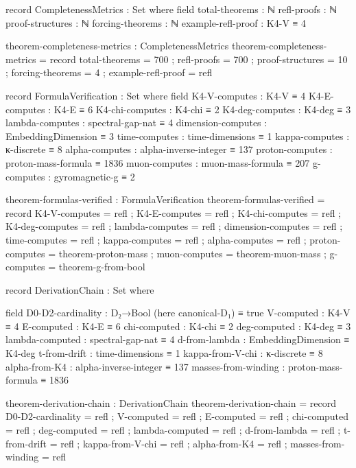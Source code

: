 \documentclass[11pt,a4paper]{book}
\begin{document}
\begin{code}
record CompletenessMetrics : Set where
  field
    total-theorems      : ℕ
    refl-proofs         : ℕ
    proof-structures    : ℕ
    forcing-theorems    : ℕ
    example-refl-proof   : K4-V ≡ 4

\end{code}

\begin{code}
theorem-completeness-metrics : CompletenessMetrics
theorem-completeness-metrics = record
  { total-theorems = 700
  ; refl-proofs = 700
  ; proof-structures = 10
  ; forcing-theorems = 4
  ; example-refl-proof = refl
  }

record FormulaVerification : Set where
  field
    K4-V-computes        : K4-V ≡ 4
    K4-E-computes        : K4-E ≡ 6
    K4-chi-computes      : K4-chi ≡ 2
    K4-deg-computes      : K4-deg ≡ 3
    lambda-computes      : spectral-gap-nat ≡ 4
    dimension-computes   : EmbeddingDimension ≡ 3
    time-computes        : time-dimensions ≡ 1
    kappa-computes       : κ-discrete ≡ 8
    alpha-computes       : alpha-inverse-integer ≡ 137
    proton-computes      : proton-mass-formula ≡ 1836
    muon-computes        : muon-mass-formula ≡ 207
    g-computes           : gyromagnetic-g ≡ 2

theorem-formulas-verified : FormulaVerification
theorem-formulas-verified = record
  { K4-V-computes = refl
  ; K4-E-computes = refl
  ; K4-chi-computes = refl
  ; K4-deg-computes = refl
  ; lambda-computes = refl
  ; dimension-computes = refl
  ; time-computes = refl
  ; kappa-computes = refl
  ; alpha-computes = refl
  ; proton-computes = theorem-proton-mass
  ; muon-computes = theorem-muon-mass
  ; g-computes = theorem-g-from-bool
  }
\end{code}

\begin{code}
record DerivationChain : Set where

  field
    D0-D2-cardinality    : D₂→Bool (here canonical-D₁) ≡ true
    V-computed           : K4-V ≡ 4
    E-computed           : K4-E ≡ 6
    chi-computed         : K4-chi ≡ 2
    deg-computed         : K4-deg ≡ 3
    lambda-computed      : spectral-gap-nat ≡ 4
    d-from-lambda        : EmbeddingDimension ≡ K4-deg
    t-from-drift         : time-dimensions ≡ 1
    kappa-from-V-chi     : κ-discrete ≡ 8
    alpha-from-K4        : alpha-inverse-integer ≡ 137
    masses-from-winding  : proton-mass-formula ≡ 1836

theorem-derivation-chain : DerivationChain
theorem-derivation-chain = record
  { D0-D2-cardinality    = refl
  ; V-computed           = refl
  ; E-computed           = refl
  ; chi-computed         = refl
  ; deg-computed         = refl
  ; lambda-computed      = refl
  ; d-from-lambda        = refl
  ; t-from-drift         = refl
  ; kappa-from-V-chi     = refl
  ; alpha-from-K4        = refl
  ; masses-from-winding  = refl
  }
\end{code}
\end{document}
